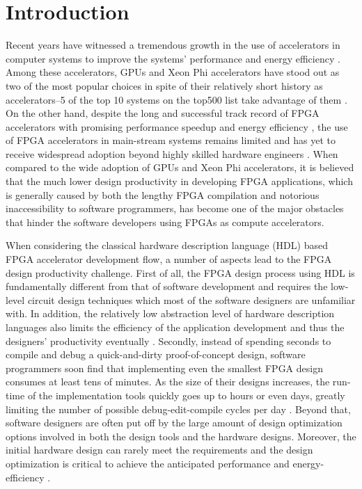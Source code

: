 \chapter{Introduction} \label{chapter:intro} 
\setcounter{page}{1}

Recent years have witnessed a tremendous growth in the use of accelerators in computer systems to improve the systems' performance and energy efficiency \cite{kim2014compression, majumder2014hardware, souradip2010hardware, putnam2014reconfigurable}. Among these accelerators, GPUs and Xeon Phi accelerators have stood out as two of the most popular choices in spite of their relatively short history as accelerators--5 of the top 10 systems on the top500 list take advantage of them \cite{top500}. On the other hand, despite the long and successful track record of FPGA accelerators with promising performance speedup and energy efficiency \cite{iouliia2004reconfigurable, souradip2010hardware, asano2009performance, che2008accelerating, thomas2009comparison}, the use of FPGA accelerators in main-stream systems remains limited and has yet to receive widespread adoption beyond highly skilled hardware engineers \cite{cong2011high}. When compared to the wide adoption of GPUs and Xeon Phi accelerators, it is believed that the much lower design productivity in developing FPGA applications, which is generally caused by both the lengthy FPGA compilation and notorious inaccessibility to software programmers, has become one of the major obstacles that hinder the software developers using FPGAs as compute accelerators. 

When considering the classical hardware description language (HDL) based FPGA accelerator development flow, a number of aspects lead to the FPGA design productivity challenge. First of all, the FPGA design process using HDL is fundamentally different from that of software development and requires the low-level circuit design techniques which most of the software designers are unfamiliar with. In addition, the relatively low abstraction level of hardware description languages also limits the efficiency of the application development and thus the designers' productivity eventually \cite{cong2011high}. Secondly, instead of spending seconds to compile and debug a quick-and-dirty proof-of-concept design, software programmers soon find that implementing even the smallest FPGA design consumes at least tens of minutes. As the size of their designs increases, the run-time of the implementation tools quickly goes up to hours or even days, greatly limiting the number of possible debug-edit-compile cycles per day \cite{lavin2010using, lavin2011HMFlow, korf2011automatic, yue2015rapid}. Beyond that, software designers are often put off by the large amount of design optimization options involved in both the design tools and the hardware designs. Moreover, the initial hardware design can rarely meet the requirements and the design optimization is critical to achieve the anticipated performance and energy-efficiency \cite{schafer2012machine, zhong2014design, holzer2007design, schafer2012divide, liu2013learning, kurek2014automating, yanghua2016case, kapre2015driving}. 

